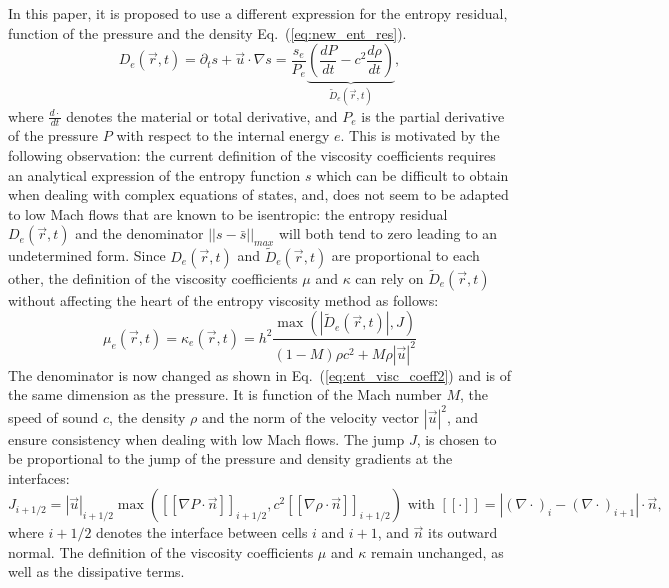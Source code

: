 \documentclass{article}
\newcommand{\eqt}[1]{Eq.~(\ref{#1})}                     %
\begin{document}
In this paper, it is proposed to use a different expression for the entropy residual, function of the pressure and the density \eqt{eq:new_ent_res}. 
\begin{equation}
\label{eq:new_ent_res}
D_e(\vec{r},t) = \partial_t s + \vec{u} \cdot \nabla s = \frac{s_e}{P_e} \underbrace{\left( \frac{d P}{dt} - c^2 \frac{d \rho}{dt} \right)}_{\tilde{D}_e(\vec{r},t)},
\end{equation}
where $\frac{d \cdot}{dt}$ denotes the material or total derivative, and $P_e$ is the partial derivative of the pressure $P$ with respect to the internal energy $e$. 
This is motivated by the following observation: the current definition of the viscosity coefficients requires an analytical expression of the entropy function $s$ which can be difficult to obtain when dealing with complex equations of states, and, does not seem to be adapted to low Mach flows that are known to be isentropic: the entropy residual $D_e(\vec{r},t)$ and the denominator $|| s - \bar{s} ||_{max}$ will both tend to zero leading to an undetermined form. Since $D_e(\vec{r},t)$ and $\tilde{D}_e(\vec{r},t)$ are proportional to each other, the definition of the viscosity coefficients $\mu$ and $\kappa$ can rely on $\tilde{D}_e(\vec{r},t)$ without affecting the heart of the entropy viscosity method as follows: 
\begin{equation}
\label{eq:ent_visc_coeff2}
\mu_e(\vec{r},t) = \kappa_e(\vec{r},t) = h^2 \frac{\max\left( | \tilde{D}_e(\vec{r},t) |, J \right)}{(1-M) \rho c^2 + M \rho |\vec{u}|^2}
\end{equation}
The denominator is now changed as shown in \eqt{eq:ent_visc_coeff2} and is of the same dimension as the pressure. It is function of the Mach number $M$, the speed of sound $c$, the density $\rho$ and the norm of the velocity vector $|\vec{u}|^2$, and ensure consistency when dealing with low Mach flows. The jump $J$,  is chosen to be proportional to the jump of the pressure and density gradients at the interfaces:
\begin{equation}
\label{eq:equation23}
J_{i+1/2} = |\vec{u}|_{i+1/2} \max \left( [[ \nabla P \cdot \vec{n} ]]_{i+1/2}, c^2 [[ \nabla \rho \cdot \vec{n} ]]_{i+1/2} \right) \text{ with } [[ \cdot ]] = |(\nabla \cdot)_i -  (\nabla \cdot)_{i+1}| \cdot \vec{n},
\end{equation}
where $i+1/2$ denotes the interface between cells $i$ and $i+1$, and $\vec{n}$ its outward normal.
The definition of the viscosity coefficients $\mu$ and $\kappa$ remain unchanged, as well as the dissipative terms.
\end{document}
